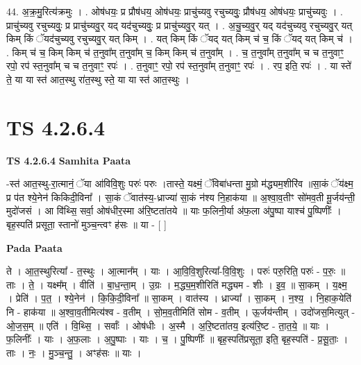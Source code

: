 \documentclass[17pt]{extarticle}
\begin{document}
44. अ॒क्र॒मु॒रित्य॑क्रमुः । . ओष॑धयः॒ प्र प्रौष॑धय॒ ओष॑धयः॒ प्राचु॑च्यवु रचुच्यवुः॒ प्रौष॑धय॒ ओष॑धयः॒ प्राचु॑च्यवुः । . प्राचु॑च्यवु रचुच्यवुः॒ प्र प्राचु॑च्यवु॒र् यद् यद॑चुच्यवुः॒ प्र प्राचु॑च्यवु॒र् यत् । . अ॒चु॒च्य॒वु॒र् यद् यद॑चुच्यवु रचुच्यवु॒र् यत् किम् किं ॅयद॑चुच्यवु रचुच्यवु॒र् यत् किम् । . यत् किम् किं ॅयद् यत् किम् च॑ च॒ किं ॅयद् यत् किम् च॑ । . किम् च॑ च॒ किम् किम् च॑ त॒नुवा᳚म् त॒नुवा᳚म् च॒ किम् किम् च॑ त॒नुवा᳚म् । . च॒ त॒नुवा᳚म् त॒नुवा᳚म् च च त॒नुवाꣳ॒॒ रपो॒ रप॑ स्त॒नुवा᳚म् च च त॒नुवाꣳ॒॒ रपः॑ । . त॒नुवाꣳ॒॒ रपो॒ रप॑ स्त॒नुवा᳚म् त॒नुवाꣳ॒॒ रपः॑ । . रप॒ इति॒ रपः॑ । . या स्ते॑ ते॒ या या स्त॑ आत॒स्थु रा॑त॒स्थु स्ते॒ या या स्त॑ आत॒स्थुः । \newline
\pagebreak
{}

\section{ TS 4.2.6.4 }

\textbf{TS 4.2.6.4 } \newline
\textbf{Samhita Paata} \newline

-स्त॑ आत॒स्थु-रा॒त्मानं॒ ॅया आ॑विवि॒शुः परुः॑ परुः ।तास्ते॒ यक्ष्मं॒ ॅविबा॑धन्ता मु॒ग्रो म॑द्ध्यम॒शीरि॑व ॥सा॒कं ॅय॑क्ष्म॒ प्र प॑त श्ये॒नेन॑ किकिदी॒विना᳚ । सा॒कं ॅवात॑स्य॒-ध्राज्या॑ सा॒कं न॑श्य नि॒हाक॑या ॥ अ॒श्वा॒व॒तीꣳ सो॑मव॒ती मू॒र्जय॑न्ती॒ मुदो॑जसं । आ वि॑थ्सि॒ सर्वा॒ ओष॑धीर॒स्मा अ॑रि॒ष्टता॑तये ॥ याः फ॒लिनी॒र्या अ॑फ॒ला अ॑पु॒ष्पा याश्च॑ पु॒ष्पिणीः᳚ । बृह॒स्पति॑ प्रसूता॒ स्तानो॑ मुञ्च॒न्त्वꣳ ह॑सः ॥ या - [  ] \newline

\textbf{Pada Paata} \newline

ते । आ॒त॒स्थुरित्या᳚ - त॒स्थुः । आ॒त्मान᳚म् । याः । आ॒वि॒वि॒शुरित्या᳚-वि॒वि॒शुः । परुः॑ परु॒रिति॒ परुः॑ - प॒रुः॒ ॥ ताः । ते॒ । यक्ष्म᳚म् । वीति॑ । बा॒ध॒न्ता॒म् । उ॒ग्रः । म॒द्ध्य॒म॒शीरिति॑ मद्ध्यम - शीः । इ॒व॒ ॥ सा॒कम् । य॒क्ष्म॒ । प्रेति॑ । प॒त॒ । श्ये॒नेन॑ । कि॒कि॒दी॒विना᳚ ॥ सा॒कम् । वात॑स्य । ध्राज्या᳚ । सा॒कम् । न॒श्य॒ । नि॒हाक॒येति॑ नि - हाक॑या ॥ अ॒श्वा॒व॒तीमित्य॑श्व - व॒तीम् । सो॒म॒व॒तीमिति॑ सोम - व॒तीम् । ऊ॒र्जय॑न्तीम् । उदो॑जस॒मित्युत् - ओ॒ज॒स॒म् ॥ एति॑ । वि॒थ्सि॒ । सर्वाः᳚ । ओष॑धीः । अ॒स्मै । अ॒रि॒ष्टता॑तय॒ इत्य॑रि॒ष्ट - ता॒त॒ये॒ ॥ याः । फ॒लिनीः᳚ । याः । अ॒फ॒लाः । अ॒पु॒ष्पाः । याः । च॒ । पु॒ष्पिणीः᳚ ॥ बृह॒स्पति॑प्रसूता॒ इति॒ बृह॒स्पति॑ - प्र॒सू॒ताः॒ । ताः । नः॒ । मु॒ञ्च॒न्तु॒ । अꣳह॑सः ॥ याः ।  \newline
\end{document}
